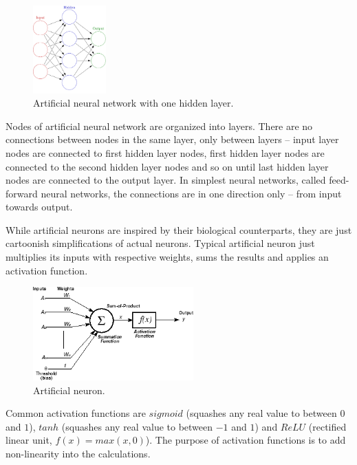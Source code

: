 \documentclass[a4paper,11pt]{article}
\begin{document}
\begin{figure}[h]
	\centering
	\includegraphics[width=0.25\textwidth]{ann.png}
	\caption{Artificial neural network with one hidden layer.}
\end{figure}

Nodes of artificial neural network are organized into layers. There are no connections between nodes in the same layer, only between layers -- input layer nodes are connected to first hidden layer nodes, first hidden layer nodes are connected to the second hidden layer nodes and so on until last hidden layer nodes are connected to the output layer. In simplest neural networks, called feed-forward neural networks, the connections are in one direction only -- from input towards output.

While artificial neurons are inspired by their biological counterparts, they are just cartoonish simplifications of actual neurons. Typical artificial neuron just multiplies its inputs with respective weights, sums the results and applies an activation function. 

\begin{figure}[h]
	\centering
	\includegraphics[width=0.55\textwidth]{neuron.png}
	\caption{Artificial neuron.}
\end{figure}

Common activation functions are $sigmoid$ (squashes any real value to between $0$ and $1$), $tanh$ (squashes any real value to between $-1$ and $1$) and $ReLU$ (rectified linear unit, $f(x)=max(x, 0)$). The purpose of activation functions is to add non-linearity into the calculations.
\end{document}
